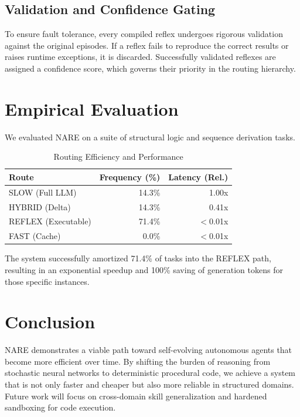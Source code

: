 \documentclass[11pt,a4paper]{article}
\begin{document}
\subsection{Validation and Confidence Gating}
To ensure fault tolerance, every compiled reflex undergoes rigorous validation against the original episodes. If a reflex fails to reproduce the correct results or raises runtime exceptions, it is discarded. Successfully validated reflexes are assigned a confidence score, which governs their priority in the routing hierarchy.

\section{Empirical Evaluation}
We evaluated NARE on a suite of structural logic and sequence derivation tasks.

\begin{table}[h]
\centering
\caption{Routing Efficiency and Performance}
\begin{tabular}{lrr}
\toprule
Route & Frequency (\%) & Latency (Rel.) \\
\midrule
SLOW (Full LLM) & 14.3\% & 1.00x \\
HYBRID (Delta) & 14.3\% & 0.41x \\
REFLEX (Executable) & 71.4\% & $<$0.01x \\
FAST (Cache) & 0.0\% & $<$0.01x \\
\bottomrule
\end{tabular}
\end{table}

The system successfully amortized 71.4\% of tasks into the REFLEX path, resulting in an exponential speedup and 100\% saving of generation tokens for those specific instances.

\section{Conclusion}
NARE demonstrates a viable path toward self-evolving autonomous agents that become more efficient over time. By shifting the burden of reasoning from stochastic neural networks to deterministic procedural code, we achieve a system that is not only faster and cheaper but also more reliable in structured domains. Future work will focus on cross-domain skill generalization and hardened sandboxing for code execution.
\end{document}
